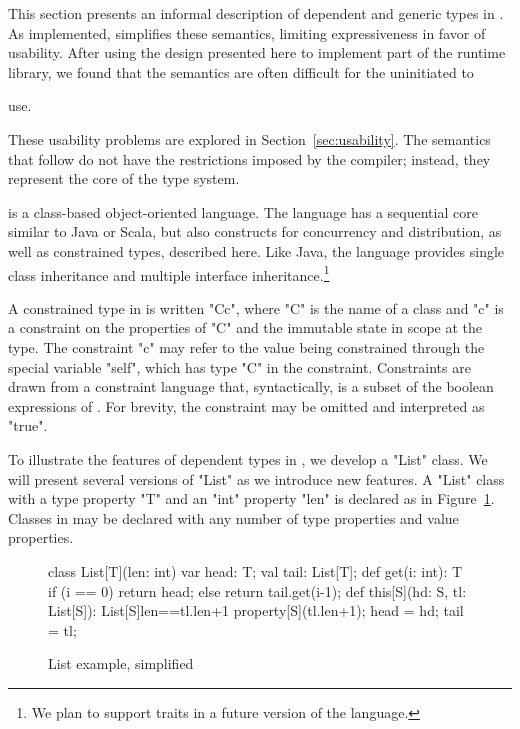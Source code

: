 
\newif\ifwild
\wildfalse

This section presents an informal description of 
dependent and generic types in \Xten{}.  
As implemented, \Xten simplifies these 
semantics, limiting expressiveness in favor of usability.
After
using the design presented here to implement part of the \Xten runtime library,
we found that the semantics are
often difficult for the uninitiated to
\ifwild
use---indeed, they
provide comparable expressive power to Java wildcards, whose usability
issues are well-known~\cite{wildcards-are-evil}.
\else
use.
\fi
These usability problems are explored in Section~\ref{sec:usability}.
The semantics that follow do not have the restrictions
imposed by the \Xten compiler; instead, they represent the core
of the \Xten type system.

\Xten{} is a class-based object-oriented language.
The language has a sequential core similar to Java or Scala, but
also
constructs for concurrency and distribution, as well as constrained
types, described here.  Like Java, the language provides single class
inheritance and multiple interface inheritance.\footnote{We plan
to support traits in a future version of the language.}

A constrained type in \Xten{} is written \xcd"C{c}", where \xcd"C" is the
name of a class and \xcd"c" is a constraint on the properties
of \xcd"C" and the immutable state in scope at the type.  The
constraint \xcd"c" may refer to the value being constrained through
the special variable \xcd"self", which has type \xcd"C" in the
constraint.  Constraints are drawn from a constraint language that,
syntactically, is a subset of the boolean expressions of \Xten{}.  For
brevity, the constraint may be omitted and interpreted as \xcd"true".

To illustrate the features of dependent types in \Xten{}, we
develop a \xcd"List"
class.  We will present several versions of \xcd"List" as we
introduce new features.
A \xcd"List" class with a type property \xcd"T" and an \xcd"int"
property \xcd"len" is declared as in Figure~\ref{fig:list0}.
Classes in \Xten{} may be declared with any number of type properties and
value properties.

\begin{figure}
{
\begin{xtennoindent}
      class List[T](len: int) {
        var head: T;
        val tail: List[T];
        def get(i: int): T {
          if (i == 0) return head;
          else return tail.get(i-1);
        }
        def this[S](hd: S, tl: List[S]):
            List[S]{len==tl.len+1} {
          property[S](tl.len+1);
          head = hd; tail = tl;
        }
      }
\end{xtennoindent}
}
\caption{List example, simplified}
\label{fig:list0}
\end{figure}

